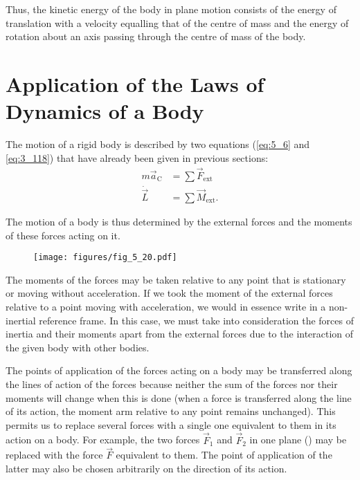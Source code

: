 Thus, the kinetic energy of the body in plane motion consists of the energy of translation with a velocity equalling that of the centre of mass and the energy of rotation about an axis passing through the centre of mass of the body.

\section{Application of the Laws of Dynamics of a Body}\label{sec:5_8}

The motion of a rigid body is described by two equations (\eqref{eq:5_6} and \eqref{eq:3_118}) that have already been given in previous sections:
\begin{align*}
	m\vec{a}_{\text{C}} &= \sum\vec{F}_{\text{ext}}\\
	\dot{\vec{L}} &= \sum\vec{M}_{\text{ext}}.
\end{align*}

\noindent
The motion of a body is thus determined by the external forces and the moments of these forces acting on it.

\begin{figure}[t]
	\begin{center}
		\texttt{[image: figures/fig\_5\_20.pdf]}
		\caption[]{}
		\label{fig:5_20}
	\end{center}
	\vspace{-1.0cm}
\end{figure}

The moments of the forces may be taken relative to any point that is stationary or moving without acceleration. If we took the moment of the external forces relative to a point moving with acceleration, we would in essence write  in a non-inertial reference frame. In this case, we must take into consideration the forces of inertia and their moments apart from the external forces due to the interaction of the given body with other bodies.

The points of application of the forces acting on a body may be transferred along the lines of action of the forces because neither the sum of the forces nor their moments will change when this is done (when a force is transferred along the line of its action, the moment arm relative to any point remains unchanged). This permits us to replace several forces with a single one equivalent to them in its action on a body. For example, the two forces $\vec{F}_1$ and $\vec{F}_2$ in one plane () may be replaced with the force $\vec{F}$ equivalent to them. The point of application of the latter may also be chosen arbitrarily on the direction of its action.

